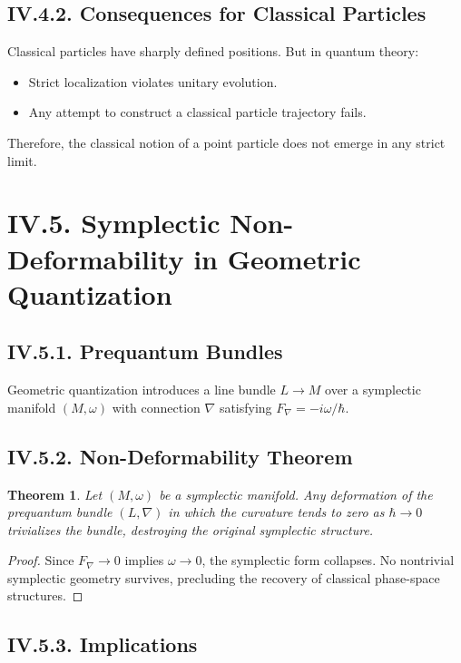 \documentclass[12pt,oneside]{book}
\theoremstyle{plain}
\newtheorem{theorem}{Theorem}[chapter]
\theoremstyle{definition}
\begin{document}
\subsection*{IV.4.2. Consequences for Classical Particles}

Classical particles have sharply defined positions. But in quantum theory:

\begin{itemize}
    \item Strict localization violates unitary evolution.
    \item Any attempt to construct a classical particle trajectory fails.
\end{itemize}

Therefore, the classical notion of a point particle does not emerge in any strict limit.

\section{IV.5. Symplectic Non-Deformability in Geometric Quantization}

\subsection*{IV.5.1. Prequantum Bundles}

Geometric quantization introduces a line bundle $L\to M$ over a symplectic manifold $(M,\omega)$ with connection $\nabla$ satisfying $F_\nabla = -i\omega/\hbar$.

\subsection*{IV.5.2. Non-Deformability Theorem}

\begin{theorem}
Let $(M,\omega)$ be a symplectic manifold. Any deformation of the prequantum bundle $(L,\nabla)$ in which the curvature tends to zero as $\hbar \to 0$ trivializes the bundle, destroying the original symplectic structure.
\end{theorem}

\begin{proof}
Since $F_\nabla \to 0$ implies $\omega \to 0$, the symplectic form collapses. No nontrivial symplectic geometry survives, precluding the recovery of classical phase-space structures.
\end{proof}

\subsection*{IV.5.3. Implications}
\end{document}

